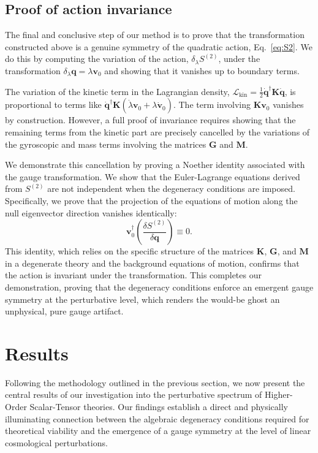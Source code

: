 \documentclass[twocolumn]{aastex631}
\begin{document}
\subsection{Proof of action invariance}
The final and conclusive step of our method is to prove that the transformation constructed above is a genuine symmetry of the quadratic action, Eq.~\eqref{eq:S2}. We do this by computing the variation of the action, $\delta_\lambda S^{(2)}$, under the transformation $\delta_\lambda \mathbf{q} = \lambda \mathbf{v}_0$ and showing that it vanishes up to boundary terms.

The variation of the kinetic term in the Lagrangian density, $\mathcal{L}_{\text{kin}} = \frac{1}{2} \dot{\mathbf{q}}^\dagger \mathbf{K} \dot{\mathbf{q}}$, is proportional to terms like $\dot{\mathbf{q}}^\dagger \mathbf{K} (\dot{\lambda}\mathbf{v}_0 + \lambda \dot{\mathbf{v}}_0)$. The term involving $\mathbf{K}\mathbf{v}_0$ vanishes by construction. However, a full proof of invariance requires showing that the remaining terms from the kinetic part are precisely cancelled by the variations of the gyroscopic and mass terms involving the matrices $\mathbf{G}$ and $\mathbf{M}$.

We demonstrate this cancellation by proving a Noether identity associated with the gauge transformation. We show that the Euler-Lagrange equations derived from $S^{(2)}$ are not independent when the degeneracy conditions are imposed. Specifically, we prove that the projection of the equations of motion along the null eigenvector direction vanishes identically:
\begin{equation}
\mathbf{v}_0^\dagger \left( \frac{\delta S^{(2)}}{\delta \mathbf{q}} \right) \equiv 0.
\end{equation}
This identity, which relies on the specific structure of the matrices $\mathbf{K}$, $\mathbf{G}$, and $\mathbf{M}$ in a degenerate theory and the background equations of motion, confirms that the action is invariant under the transformation. This completes our demonstration, proving that the degeneracy conditions enforce an emergent gauge symmetry at the perturbative level, which renders the would-be ghost an unphysical, pure gauge artifact.

\section{Results}
\label{sec:results}
Following the methodology outlined in the previous section, we now present the central results of our investigation into the perturbative spectrum of Higher-Order Scalar-Tensor theories. Our findings establish a direct and physically illuminating connection between the algebraic degeneracy conditions required for theoretical viability and the emergence of a gauge symmetry at the level of linear cosmological perturbations.
\end{document}
